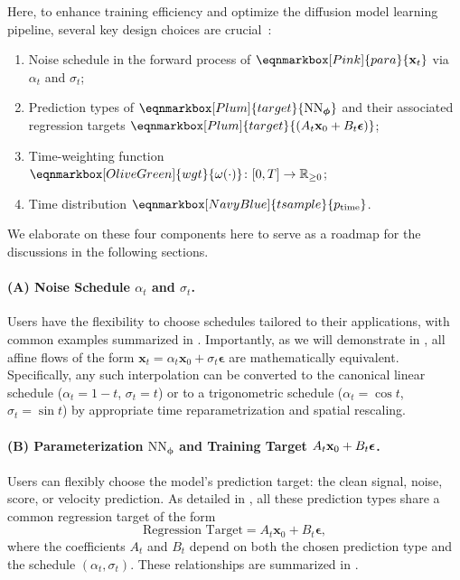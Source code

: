 Here, to enhance training efficiency and optimize the diffusion model learning pipeline, several key design choices are crucial~\citep{karras2022elucidating,lu2024simplifying}:
\begin{enumerate}
    \item[(A)] Noise schedule in the forward process of $\eqnmarkbox[Pink]{para}{\rvx_t}$ via $\alpha_t$ and $\sigma_t$;
    \item[(B)] Prediction types of $\eqnmarkbox[Plum]{target}{\mathrm{NN}_{\bm{\phi}}}$ and their associated regression targets $\eqnmarkbox[Plum]{target}{(A_t \rvx_0 + B_t \bm{\epsilon}) }$;
    \item[(C)] Time-weighting function $\eqnmarkbox[OliveGreen]{wgt}{\omega(\cdot)} \colon [0,T] \to \mathbb{R}_{\geq 0}$;
    \item[(D)] Time distribution $\eqnmarkbox[NavyBlue]{tsample}{p_{\text{time}}}$.
\end{enumerate}

We elaborate on these four components here to serve as a roadmap for the discussions in the following sections.

\paragraph{(A) Noise Schedule $\alpha_t$ and $\sigma_t$.}
Users have the flexibility to choose schedules tailored to their applications, with common examples summarized in . Importantly, as we will demonstrate in , all affine flows of the form $\mathbf{x}_t = \alpha_t \mathbf{x}_0 + \sigma_t \bm{\epsilon}$ are mathematically equivalent. Specifically, any such interpolation can be converted to the canonical linear schedule ($\alpha_t = 1 - t$, $\sigma_t = t$) or to a trigonometric schedule ($\alpha_t = \cos t$, $\sigma_t = \sin t$) by appropriate time reparametrization and spatial rescaling.


\paragraph{(B) Parameterization $\mathrm{NN}_{\bm{\phi}}$ and Training Target $A_t {\mathbf{x}}_0 + B_t \bm{\epsilon}$.}  Users can flexibly choose the model's prediction target: the clean signal, noise, score, or velocity prediction. As detailed in , all these prediction types share a common regression target of the form
\[
    \text{Regression Target} = A_t \mathbf{x}_0 + B_t \bm{\epsilon},
\]
where the coefficients $A_t$ and $B_t$ depend on both the chosen prediction type and the schedule $(\alpha_t, \sigma_t)$. These relationships are summarized in .

